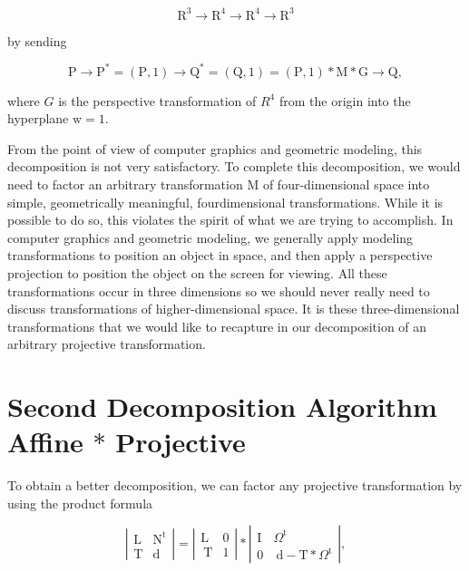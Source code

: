 $$
\mathrm{R}^{3} \rightarrow \mathrm{R}^{4} \rightarrow \mathrm{R}^{4} \rightarrow \mathrm{R}^{3}
$$

by sending

$$
\mathrm{P} \rightarrow \mathrm{P}^{*}=(\mathrm{P}, 1) \rightarrow \mathrm{Q}^{*}=(\mathrm{Q}, 1)=(\mathrm{P}, 1) * \mathrm{M} * \mathrm{G} \rightarrow \mathrm{Q},
$$

where $G$ is the perspective transformation of $R^{4}$ from the origin into the hyperplane $\mathrm{w}=1$.

From the point of view of computer graphics and geometric modeling, this decomposition is not very satisfactory. To complete this decomposition, we would need to factor an arbitrary transformation M of four-dimensional space into simple, geometrically meaningful, fourdimensional transformations. While it is possible to do so, this violates the spirit of what we are trying to accomplish. In computer graphics and geometric modeling, we generally apply modeling transformations to position an object in space, and then apply a perspective projection to position the object on the screen for viewing. All these transformations occur in three dimensions so we should never really need to discuss transformations of higher-dimensional space. It is these three-dimensional transformations that we would like to recapture in our decomposition of an arbitrary projective transformation.

\section{Second Decomposition Algorithm Affine $*$ Projective}
To obtain a better decomposition, we can factor any projective transformation by using the product formula

$$
\left|\begin{array}{cc}
\mathrm{L} & \mathrm{N}^{\mathrm{t}} \\
\mathrm{T} & \mathrm{d}
\end{array}\right|=\left|\begin{array}{cc}
\mathrm{L} & 0 \\
\mathrm{~T} & 1
\end{array}\right| *\left|\begin{array}{cc}
\mathrm{I} & \Omega^{\mathrm{t}} \\
0 & \mathrm{~d}-\mathrm{T} * \Omega^{\mathrm{t}}
\end{array}\right|,
$$

